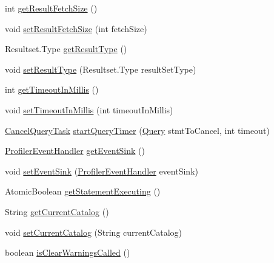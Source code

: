 \begin{DoxyCompactItemize}
int \mbox{\hyperlink{interfacecom_1_1mysql_1_1cj_1_1_query_a6f08d61e84781710d7e9c4680c2835b3}{get\+Result\+Fetch\+Size}} ()
\item 
void \mbox{\hyperlink{interfacecom_1_1mysql_1_1cj_1_1_query_aa27382e91d04ac9f8f6944dc3949b652}{set\+Result\+Fetch\+Size}} (int fetch\+Size)
\item 
Resultset.\+Type \mbox{\hyperlink{interfacecom_1_1mysql_1_1cj_1_1_query_a1e97cf75ff946bef7b89512a69199b90}{get\+Result\+Type}} ()
\item 
void \mbox{\hyperlink{interfacecom_1_1mysql_1_1cj_1_1_query_abb2b03623cac9e35394b4ed22008f683}{set\+Result\+Type}} (Resultset.\+Type result\+Set\+Type)
\item 
int \mbox{\hyperlink{interfacecom_1_1mysql_1_1cj_1_1_query_a54f609a5c08b91fe0008e9b3334d0d82}{get\+Timeout\+In\+Millis}} ()
\item 
void \mbox{\hyperlink{interfacecom_1_1mysql_1_1cj_1_1_query_a9bdb29806cdcfabc9bf48c9c7872d777}{set\+Timeout\+In\+Millis}} (int timeout\+In\+Millis)
\item 
\mbox{\hyperlink{interfacecom_1_1mysql_1_1cj_1_1_cancel_query_task}{Cancel\+Query\+Task}} \mbox{\hyperlink{interfacecom_1_1mysql_1_1cj_1_1_query_a05d5eedcc76ab8fe224f4e2df0e4d274}{start\+Query\+Timer}} (\mbox{\hyperlink{interfacecom_1_1mysql_1_1cj_1_1_query}{Query}} stmt\+To\+Cancel, int timeout)
\item 
\mbox{\hyperlink{interfacecom_1_1mysql_1_1cj_1_1log_1_1_profiler_event_handler}{Profiler\+Event\+Handler}} \mbox{\hyperlink{interfacecom_1_1mysql_1_1cj_1_1_query_a3e23446737570171c4323243ce3f9239}{get\+Event\+Sink}} ()
\item 
void \mbox{\hyperlink{interfacecom_1_1mysql_1_1cj_1_1_query_ad50d1ecd73b6b2cac60cff6bec83bfbf}{set\+Event\+Sink}} (\mbox{\hyperlink{interfacecom_1_1mysql_1_1cj_1_1log_1_1_profiler_event_handler}{Profiler\+Event\+Handler}} event\+Sink)
\item 
Atomic\+Boolean \mbox{\hyperlink{interfacecom_1_1mysql_1_1cj_1_1_query_a330ed617e56f62061a3a300128456dbb}{get\+Statement\+Executing}} ()
\item 
String \mbox{\hyperlink{interfacecom_1_1mysql_1_1cj_1_1_query_a5e5e4f493fd7d0ea5e0ac6d2066af251}{get\+Current\+Catalog}} ()
\item 
void \mbox{\hyperlink{interfacecom_1_1mysql_1_1cj_1_1_query_a456b19ab936c8d8ecd49dc23aaf6a833}{set\+Current\+Catalog}} (String current\+Catalog)
\item 
boolean \mbox{\hyperlink{interfacecom_1_1mysql_1_1cj_1_1_query_af3f72d084a40a8ec805f10b75b8fa0f2}{is\+Clear\+Warnings\+Called}} ()

\end{DoxyCompactItemize}
